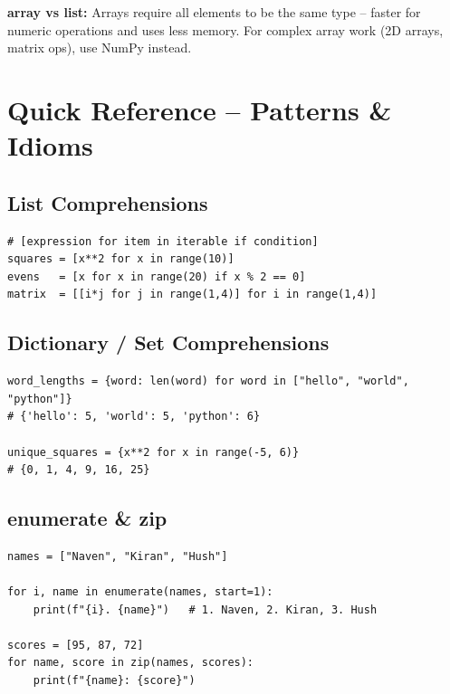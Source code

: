 \documentclass[12pt,a4paper]{article}
\begin{document}
\begin{notebox}
\textbf{array vs list:} Arrays require all elements to be the same type -- faster for numeric operations and uses less memory. For complex array work (2D arrays, matrix ops), use NumPy instead.
\end{notebox}

\section{Quick Reference -- Patterns \& Idioms}

\subsection{List Comprehensions}

\begin{lstlisting}
# [expression for item in iterable if condition]
squares = [x**2 for x in range(10)]
evens   = [x for x in range(20) if x % 2 == 0]
matrix  = [[i*j for j in range(1,4)] for i in range(1,4)]
\end{lstlisting}

\subsection{Dictionary / Set Comprehensions}

\begin{lstlisting}
word_lengths = {word: len(word) for word in ["hello", "world", "python"]}
# {'hello': 5, 'world': 5, 'python': 6}

unique_squares = {x**2 for x in range(-5, 6)}
# {0, 1, 4, 9, 16, 25}
\end{lstlisting}

\subsection{enumerate \& zip}

\begin{lstlisting}
names = ["Naven", "Kiran", "Hush"]

for i, name in enumerate(names, start=1):
    print(f"{i}. {name}")   # 1. Naven, 2. Kiran, 3. Hush

scores = [95, 87, 72]
for name, score in zip(names, scores):
    print(f"{name}: {score}")
\end{lstlisting}
\end{document}
